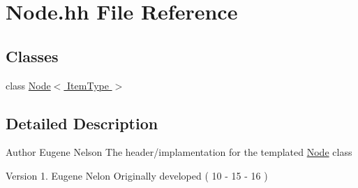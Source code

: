 \hypertarget{_node_8hh}{\section{Node.\-hh File Reference}
\label{_node_8hh}
}
\subsection*{Classes}
\begin{DoxyCompactItemize}
\item 
class \hyperlink{class_node}{Node$<$ Item\-Type $>$}
\end{DoxyCompactItemize}


\subsection{Detailed Description}
\begin{DoxyAuthor}{Author}
Eugene Nelson  The header/implamentation for the templated \hyperlink{class_node}{Node} class 
\end{DoxyAuthor}
\begin{DoxyVersion}{Version}
1. Eugene Nelon Originally developed ( 10 -\/ 15 -\/ 16 ) 
\end{DoxyVersion}
